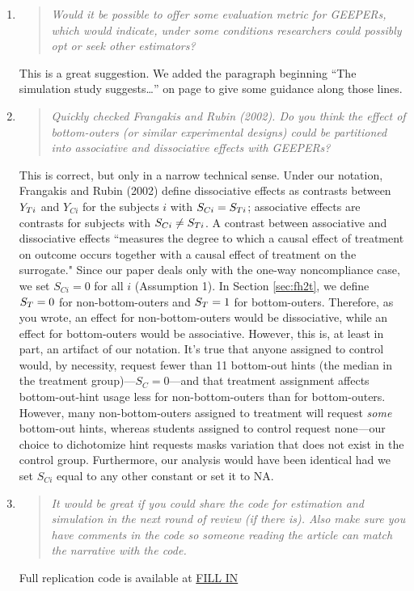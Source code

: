 \documentclass[]{article}
\newenvironment{itquote}
  {\begin{quote} \itshape}
  {\end{quote}\ignorespacesafterend}
\begin{document}
\begin{enumerate}
\begin{enumerate}
\item \begin{itquote}    Would it be possible to offer some evaluation metric for GEEPERs, which would indicate, under some conditions researchers could possibly opt or seek other estimators?
\end{itquote}
This is a great suggestion. We added the paragraph beginning ``The simulation study suggests\dots'' on page \pageref{evalMetric} to give some guidance along those lines. 
\item \begin{itquote}     Quickly checked Frangakis and Rubin (2002). Do you think the effect of bottom-outers (or similar experimental designs) could be partitioned into associative and dissociative effects with GEEPERs?
\end{itquote}
This is correct, but only in a narrow technical sense. 
Under our notation, Frangakis and Rubin (2002) define dissociative effects as contrasts between $Y_{Ti}$ and $Y_{Ci}$ for the subjects $i$ with $S_{Ci}=S_{Ti}$; associative effects are contrasts for subjects with $S_{Ci}\ne S_{Ti}$. A contrast between associative and dissociative effects ``measures the degree to which a causal effect of treatment on outcome occurs together with a causal effect of treatment on the surrogate."  Since our paper deals only with the one-way noncompliance case, we set $S_{Ci}=0$ for all $i$ (Assumption 1). In Section \ref{sec:fh2t}, we define $S_T=0$ for non-bottom-outers and $S_T=1$ for bottom-outers. Therefore, as you wrote, an effect for non-bottom-outers would be dissociative, while an effect for bottom-outers would be associative. However, this is, at least in part, an artifact of our notation. It's true that anyone assigned to control would, by necessity, request fewer than 11 bottom-out hints (the median in the treatment group)---$S_C=0$---and that treatment assignment affects bottom-out-hint usage less for non-bottom-outers than for bottom-outers. However, many non-bottom-outers assigned to treatment will request \emph{some} bottom-out hints, whereas students assigned to control request none---our choice to dichotomize hint requests masks variation that does not exist in the control group. Furthermore, our analysis would have been identical had we set $S_{Ci}$ equal to any other constant or set it to NA. 

\item \begin{itquote}    It would be great if you could share the code for estimation and simulation in the next round of review (if there is). Also make sure you have comments in the code so someone reading the article can match the narrative with the code.
\end{itquote}
Full replication code is available at \url{FILL IN} 
\end{enumerate}


\end{enumerate}
\end{document}
